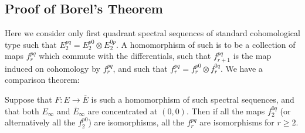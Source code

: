 \documentclass[11pt]{article}
\begin{document}
\subsection{Proof of Borel's Theorem}
Here we consider only first quadrant spectral sequences of standard cohomological type such that $E_2^{pq}=E_2^{p0}\otimes E_2^{0p}$. A homomorphism of such is to be a collection of maps $f_r^{pq}$ which commute with the differentials, such that $f^{pq}_{r+1}$ is the map induced  on cohomology by $f^{pq}_r$, and such that $f_r^{pq}=f_r^{p0}\otimes f_r^{0q}$. We have a comparison theorem:
\begin{thm*}
Suppose that $F:E\to\overline E$ is such a homomorphism of such spectral sequences, and that both $E_\infty$ and $\overline E_\infty$ are concentrated at $(0,0)$. Then if all the maps $f_2^{0q}$ (or alternatively all the $f_2^{p0}$) are isomorphisms, all the $f_r^{pq}$ are isomorphisms for $r\geq2$.
\end{thm*}
\end{document}

